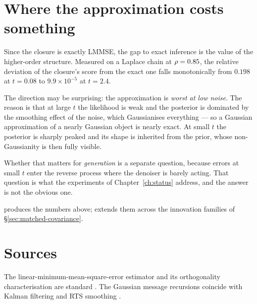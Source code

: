 \section{Where the approximation costs something}

Since the closure is exactly LMMSE, the gap to exact inference is the value of the
higher-order structure. Measured on a Laplace chain at $\rho=0.85$, the relative deviation of
the closure's score from the exact one falls monotonically from $0.198$ at $t=0.08$ to
$9.9\times10^{-5}$ at $t=2.4$.

\begin{intuition}
The direction may be surprising: the approximation is \emph{worst at low noise}. The reason is
that at large $t$ the likelihood is weak and the posterior is dominated by the smoothing effect
of the noise, which Gaussianises everything --- so a Gaussian approximation of a nearly Gaussian
object is nearly exact. At small $t$ the posterior is sharply peaked and its shape is inherited
from the prior, whose non-Gaussianity is then fully visible.

Whether that matters for \emph{generation} is a separate question, because errors at small $t$
enter the reverse process where the denoiser is barely acting. That question is what the
experiments of Chapter~\ref{ch:status} address, and the answer is not the obvious one.
\end{intuition}

\begin{codebox}
 produces the numbers
above;  extends them across
the innovation families of \S\ref{sec:matched-covariance}.
\end{codebox}

\section*{Sources}
The linear-minimum-mean-square-error estimator and its orthogonality characterisation are
standard \citep{kay1993,lehmann1998}. The Gaussian message recursions coincide with Kalman
filtering and RTS smoothing \citep{kalman1960new,rauch1965maximum}.
